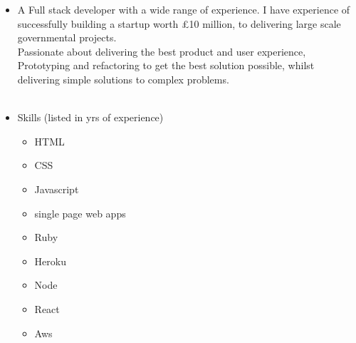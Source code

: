 

\begin{cvparagraph}
    \begin{multicols}{2}
        \begin{itemize}[label={}]
            \item A Full stack developer with a wide range of experience. I have experience of successfully
            building a startup worth £10 million, to delivering large scale governmental projects. \\
            
            Passionate about delivering the best product and user experience, Prototyping and refactoring 
            to get the best solution possible, whilst delivering simple solutions to complex problems. \\ \\
            
            \item 
                Skills (listed in yrs of experience)
                \begin{itemize}
                    \itemsep-0.4em 
                    \item HTML
                    \item CSS
                    \item Javascript
                    \item single page web apps
                    \item Ruby
                    \item Heroku
                    \item Node
                    \item React
                    \item Aws

                \end{itemize}
        \end{itemize}
        \end{multicols}
        \vspace{-1cm}
\end{cvparagraph}
